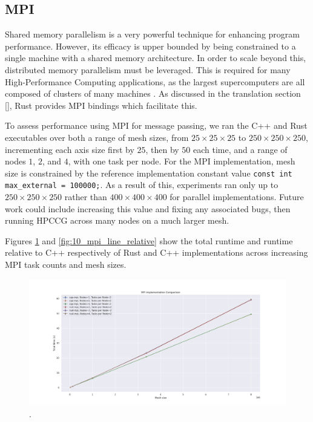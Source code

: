 \subsection{MPI}
\label{ssec:mpi}

Shared memory parallelism is a very powerful technique for enhancing program performance. However, its efficacy is upper bounded by being constrained to a single machine with a shared memory architecture. In order to scale beyond this, distributed memory parallelism must be leveraged. This is required for many High-Performance Computing applications, as the largest supercomputers are all composed of clusters of many machines \cite{HomeTOP500}. As discussed in the translation section \ref{}, Rust provides MPI bindings which facilitate this.

To assess performance using MPI for message passing, we ran the C++ and Rust executables over both a range of mesh sizes, from $25 \times 25 \times 25$ to $250 \times 250 \times 250$, incrementing each axis size first by $25$, then by $50$ each time, and a range of nodes $1$, $2$, and $4$, with one task per node. For the MPI implementation, mesh size is constrained by the reference implementation constant value \texttt{const int max_external = 100000;}. As a result of this, experiments ran only up to $250 \times 250 \times 250$ rather than $400 \times 400 \times 400$ for parallel implementations. Future work could include increasing this value and fixing any associated bugs, then running HPCCG across many nodes on a much larger mesh. 

Figures \ref{fig:9_mpi_line} and \ref{fig:10_mpi_line_relative} show the total runtime and runtime relative to C++ respectively of Rust and C++ implementations across increasing MPI task counts and mesh sizes.

\begin{figure}[H]
    \centering
    \includegraphics[width=\textwidth]{images/5_performance/parallelism/9_mpi_line.png}
    \caption{.}
    \label{fig:9_mpi_line}
\end{figure}

